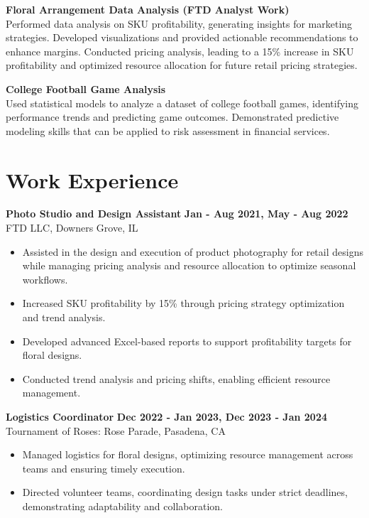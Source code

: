 \documentclass[10pt]{article}
\begin{document}
\vspace{0pt}
\textbf{Floral Arrangement Data Analysis (FTD Analyst Work)} \\
Performed data analysis on SKU profitability, generating insights for marketing strategies. Developed visualizations and provided actionable recommendations to enhance margins. Conducted pricing analysis, leading to a 15\% increase in SKU profitability and optimized resource allocation for future retail pricing strategies.

\vspace{0pt}
\textbf{College Football Game Analysis} \\
Used statistical models to analyze a dataset of college football games, identifying performance trends and predicting game outcomes. Demonstrated predictive modeling skills that can be applied to risk assessment in financial services.

\vspace{-10pt}
\section*{Work Experience}
\vspace{0pt}
\textbf{Photo Studio and Design Assistant} \hfill \textbf{Jan - Aug 2021, May - Aug 2022} \\
FTD LLC, Downers Grove, IL \\
\begin{itemize}[noitemsep,nosep]
    \item Assisted in the design and execution of product photography for retail designs while managing pricing analysis and resource allocation to optimize seasonal workflows.
    \item Increased SKU profitability by 15\% through pricing strategy optimization and trend analysis.
    \item Developed advanced Excel-based reports to support profitability targets for floral designs.
    \item Conducted trend analysis and pricing shifts, enabling efficient resource management.
\end{itemize}

\vspace{0pt}
\textbf{Logistics Coordinator} \hfill \textbf{Dec 2022 - Jan 2023, Dec 2023 - Jan 2024} \\
Tournament of Roses: Rose Parade, Pasadena, CA \\
\begin{itemize}[noitemsep,nosep]
    \item Managed logistics for floral designs, optimizing resource management across teams and ensuring timely execution.
    \item Directed volunteer teams, coordinating design tasks under strict deadlines, demonstrating adaptability and collaboration.
\end{itemize}
\end{document}
